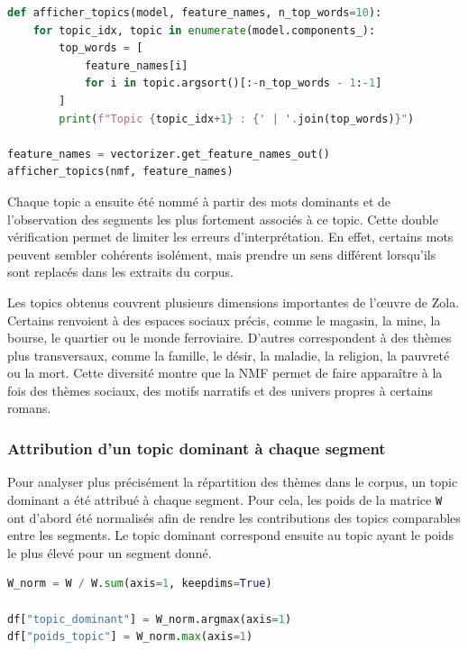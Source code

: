 \documentclass{article}
\begin{document}
\begin{lstlisting}[language=Python, caption={Affichage des mots les plus importants par topic}]
def afficher_topics(model, feature_names, n_top_words=10):
    for topic_idx, topic in enumerate(model.components_):
        top_words = [
            feature_names[i]
            for i in topic.argsort()[:-n_top_words - 1:-1]
        ]
        print(f"Topic {topic_idx+1} : {' | '.join(top_words)}")

feature_names = vectorizer.get_feature_names_out()
afficher_topics(nmf, feature_names)
\end{lstlisting}

Chaque topic a ensuite été nommé à partir des mots dominants et de l'observation des segments les plus fortement associés à ce topic. Cette double vérification permet de limiter les erreurs d'interprétation. En effet, certains mots peuvent sembler cohérents isolément, mais prendre un sens différent lorsqu'ils sont replacés dans les extraits du corpus.

Les topics obtenus couvrent plusieurs dimensions importantes de l'œuvre de Zola. Certains renvoient à des espaces sociaux précis, comme le magasin, la mine, la bourse, le quartier ou le monde ferroviaire. D'autres correspondent à des thèmes plus transversaux, comme la famille, le désir, la maladie, la religion, la pauvreté ou la mort. Cette diversité montre que la NMF permet de faire apparaître à la fois des thèmes sociaux, des motifs narratifs et des univers propres à certains romans.

\subsubsection{Attribution d'un topic dominant à chaque segment}

Pour analyser plus précisément la répartition des thèmes dans le corpus, un topic dominant a été attribué à chaque segment. Pour cela, les poids de la matrice \texttt{W} ont d'abord été normalisés afin de rendre les contributions des topics comparables entre les segments. Le topic dominant correspond ensuite au topic ayant le poids le plus élevé pour un segment donné.

\begin{lstlisting}[language=Python, caption={Attribution du topic dominant à chaque segment}]
W_norm = W / W.sum(axis=1, keepdims=True)

df["topic_dominant"] = W_norm.argmax(axis=1)
df["poids_topic"] = W_norm.max(axis=1)
\end{lstlisting}
\end{document}
